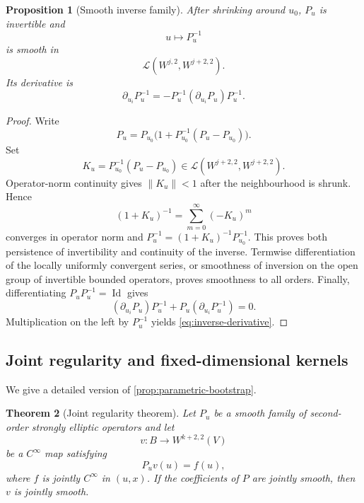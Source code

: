 \documentclass[11pt,reqno]{amsart}
\newtheorem{theorem}{Theorem}[section]
\newtheorem{proposition}[theorem]{Proposition}
\theoremstyle{definition}
\theoremstyle{remark}
\newcommand{\Id}{\operatorname{Id}}
\begin{document}
\begin{proposition}[Smooth inverse family]\label{prop:smooth-inverse-app}
After shrinking around $u_0$, $P_u$ is invertible and
\[
  u\mapsto P_u^{-1}
\]
is smooth in
\[
  \mathcal L(W^{j,2},W^{j+2,2}).
\]
Its derivative is
\begin{equation}\label{eq:inverse-derivative}
  \partial_{u_i}P_u^{-1}
  =-P_u^{-1}(\partial_{u_i}P_u)P_u^{-1}.
\end{equation}
\end{proposition}

\begin{proof}
Write
\[
  P_u=P_{u_0}\bigl(1+P_{u_0}^{-1}(P_u-P_{u_0})\bigr).
\]
Set
\[
 K_u=P_{u_0}^{-1}(P_u-P_{u_0})
 \in\mathcal L(W^{j+2,2},W^{j+2,2}).
\]
Operator-norm continuity gives $\|K_u\|<1$ after the neighbourhood is
shrunk.  Hence
\[
 (1+K_u)^{-1}=\sum_{m=0}^\infty(-K_u)^m
\]
converges in operator norm and
$P_u^{-1}=(1+K_u)^{-1}P_{u_0}^{-1}$.  This proves both persistence of
invertibility and continuity of the inverse.  Termwise differentiation
of the locally uniformly convergent series, or smoothness of inversion
on the open group of invertible bounded operators, proves smoothness to
all orders.  Finally, differentiating
$P_uP_u^{-1}=\Id$ gives
\[
 (\partial_{u_i}P_u)P_u^{-1}
 +P_u(\partial_{u_i}P_u^{-1})=0.
\]
Multiplication on the left by $P_u^{-1}$ yields
\eqref{eq:inverse-derivative}.
\end{proof}

\subsection{Joint regularity and fixed-dimensional kernels}

We give a detailed version of \cref{prop:parametric-bootstrap}.

\begin{theorem}[Joint regularity theorem]\label{thm:joint-regularity-app}
Let $P_u$ be a smooth family of second-order strongly elliptic operators and let
\[
  v:B\to W^{k+2,2}(V)
\]
be a $C^\infty$ map satisfying
\[
  P_uv(u)=f(u),
\]
where $f$ is jointly $C^\infty$ in $(u,x)$.  If the coefficients of $P$ are jointly smooth, then $v$ is jointly smooth.
\end{theorem}
\end{document}
